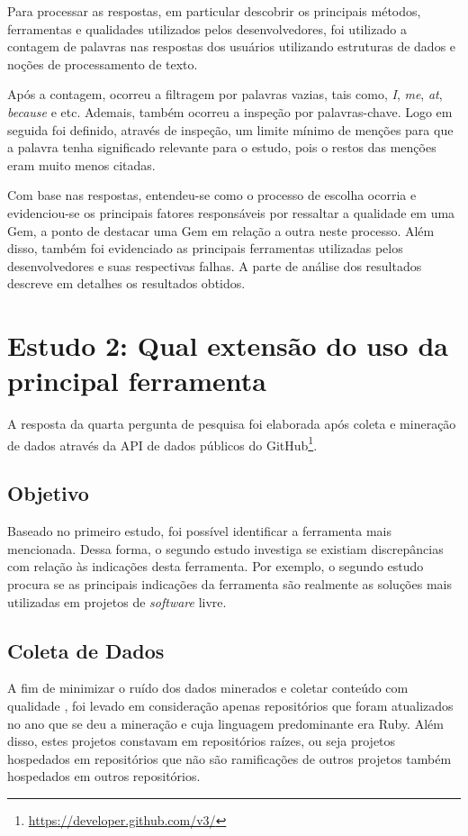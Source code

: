 Para processar as respostas, em particular descobrir os principais métodos, ferramentas e qualidades utilizados pelos desenvolvedores, foi utilizado a contagem de palavras nas respostas dos usuários utilizando estruturas de dados e noções de processamento de texto.

Após a contagem, ocorreu a filtragem por palavras vazias, tais como, \textit{I}, \textit{me}, \textit{at}, \textit{because} e etc. Ademais, também ocorreu a inspeção por palavras-chave. Logo em seguida foi definido, através de inspeção, um limite mínimo de menções para que a palavra tenha significado relevante para o estudo, pois o restos das menções eram muito menos citadas.

Com base nas respostas, entendeu-se como o processo de escolha ocorria e evidenciou-se os principais fatores responsáveis por ressaltar a qualidade em uma Gem, a ponto de destacar uma Gem em relação a outra neste processo. Além disso, também foi evidenciado as principais ferramentas utilizadas pelos desenvolvedores e suas respectivas falhas. A parte de análise dos resultados descreve em detalhes os resultados obtidos.

\section{Estudo 2: Qual extensão do uso da principal ferramenta}

A resposta da quarta pergunta de pesquisa foi elaborada após coleta e mineração de dados através da API de dados públicos do GitHub\footnote{\url{https://developer.github.com/v3/}}. 

\subsection{Objetivo}

Baseado no primeiro estudo, foi possível identificar a ferramenta mais mencionada. Dessa forma, o segundo estudo investiga se existiam discrepâncias com relação às indicações desta ferramenta. Por exemplo, o segundo estudo procura se as principais indicações da ferramenta são realmente as soluções mais utilizadas em projetos de \textit{software} livre.

\subsection{Coleta de Dados}

A fim de minimizar o ruído dos dados minerados e coletar conteúdo com qualidade \cite{Kalliamvakou:2014:PPM:2597073.2597074}, foi levado em consideração apenas repositórios que foram atualizados no ano que se deu a mineração e cuja linguagem predominante era Ruby. Além disso, estes projetos constavam em repositórios raízes, ou seja projetos hospedados em repositórios que não são ramificações de outros projetos também hospedados em outros repositórios.

